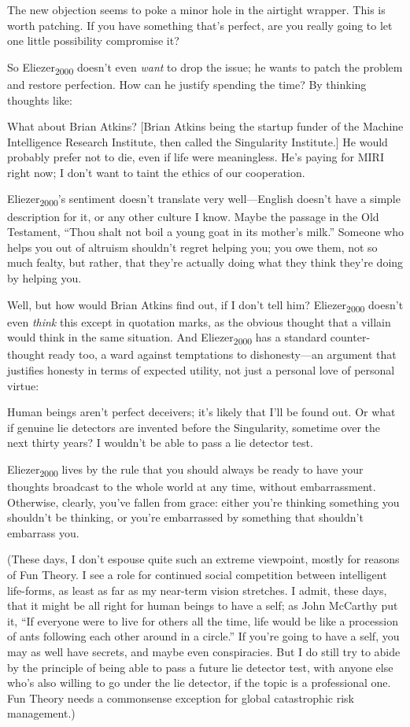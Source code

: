 {
 The new objection seems to poke a minor hole in the airtight
wrapper. This is worth patching. If you have something
that's perfect, are you really going to let one little
possibility compromise it?}

{
 So Eliezer\textsubscript{2000} doesn't even
\textit{want} to drop the issue; he wants to patch the problem and
restore perfection. How can he justify spending the time? By thinking
thoughts like:}

{
 What about Brian Atkins? [Brian Atkins being the startup funder of
the Machine Intelligence Research Institute, then called the
Singularity Institute.] He would probably prefer not to die, even if
life were meaningless. He's paying for MIRI right now;
I don't want to taint the ethics of our cooperation.}

{
 Eliezer\textsubscript{2000}'s sentiment
doesn't translate very well---English
doesn't have a simple description for it, or any other
culture I know. Maybe the passage in the Old Testament,
``Thou shalt not boil a young goat in its
mother's milk.'' Someone who helps
you out of altruism shouldn't regret helping you; you
owe them, not so much fealty, but rather, that they're
actually doing what they think they're doing by helping
you.}

{
 Well, but how would Brian Atkins find out, if I
don't tell him? Eliezer\textsubscript{2000}
doesn't even \textit{think} this except in quotation
marks, as the obvious thought that a villain would think in the same
situation. And Eliezer\textsubscript{2000} has a standard
counter-thought ready too, a ward against temptations to
dishonesty---an argument that justifies honesty in terms of expected
utility, not just a personal love of personal virtue:}

{
 Human beings aren't perfect deceivers;
it's likely that I'll be found out. Or
what if genuine lie detectors are invented before the Singularity,
sometime over the next thirty years? I wouldn't be able
to pass a lie detector test.}

{
 Eliezer\textsubscript{2000} lives by the rule that you should
always be ready to have your thoughts broadcast to the whole world at
any time, without embarrassment. Otherwise, clearly,
you've fallen from grace: either you're
thinking something you shouldn't be thinking, or
you're embarrassed by something that
shouldn't embarrass you.}

{
 (These days, I don't espouse quite such an extreme
viewpoint, mostly for reasons of Fun Theory. I see a role for continued
social competition between intelligent life-forms, as least as far as
my near-term vision stretches. I admit, these days, that it might be
all right for human beings to have a self; as John McCarthy put it,
``If everyone were to live for others all the time,
life would be like a procession of ants following each other around in
a circle.'' If you're going to have a
self, you may as well have secrets, and maybe even conspiracies. But I
do still try to abide by the principle of being able to pass a future
lie detector test, with anyone else who's also willing
to go under the lie detector, if the topic is a professional one. Fun
Theory needs a commonsense exception for global catastrophic risk
management.)}


